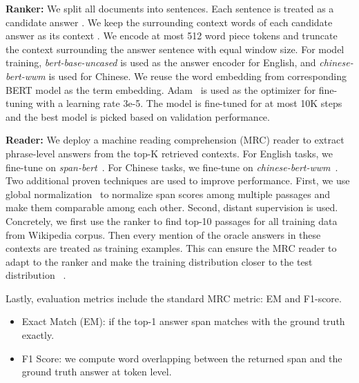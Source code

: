 \documentclass[11pt,a4paper]{article}
\begin{document}
\textbf{Ranker:}
We split all documents into sentences. Each sentence is treated as a candidate answer . We keep the surrounding context words of each candidate answer as its context . We encode at most 512 word piece tokens and truncate the context surrounding the answer sentence with equal window size. For model training, \textit{bert-base-uncased} is used as the answer encoder for English, and \textit{chinese-bert-wwm} is used for Chinese. We reuse the word embedding from corresponding BERT model as the term embedding. Adam~\cite{kingma2014adam} is used as the optimizer for fine-tuning with a learning rate 3e-5. The model is fine-tuned for at most 10K steps and the best model is picked based on validation performance.

\textbf{Reader:} We deploy a machine reading comprehension (MRC) reader to extract phrase-level answers from the top-K retrieved contexts. For English tasks, we fine-tune on \textit{span-bert}~\cite{joshi2020spanbert}. For Chinese tasks, we fine-tune on \textit{chinese-bert-wwm}~\cite{cui-etal-2020-revisiting}. Two additional proven techniques are used to improve performance. First, we use global normalization~\cite{clark2017simple} to normalize span scores among multiple passages and make them comparable among each other. Second, distant supervision is used. Concretely, we first use the ranker to find top-10 passages for all training data from Wikipedia corpus. Then every mention of the oracle answers in these contexts are treated as training examples. This can ensure the MRC reader to adapt to the ranker and make the training distribution closer to the test distribution ~\cite{xie2020distant}.

Lastly, evaluation metrics include the standard MRC metric: EM and F1-score.

\begin{itemize}
    \item Exact Match (EM): if the top-1 answer span matches with the ground truth exactly.
    \item F1 Score: we compute word overlapping between the returned span and the ground truth answer at token level.
\end{itemize}
\end{document}
